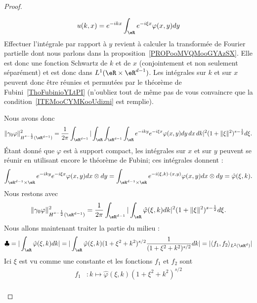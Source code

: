 \begin{proof}
\begin{subproof}
\begin{equation}
			u(k,x)= e^{-ikx}\int_{\eR} e^{-i\xi x}\varphi(x,y)dy
		\end{equation}
		Effectuer l'intégrale par rapport à \( y\) revient à calculer la transformée de Fourier partielle dont nous parlons dans la proposition~\ref{PROPooMVQMooGYAzSX}. Elle est donc une fonction Schwartz de \( k\) et de \( x\) (conjointement et non seulement séparément) et est donc dans \( L^1(\eR\times \eR^{d-1})\). Les intégrales sur \( k \) et sur \( x\) peuvent donc être réunies et permutées par le théorème de Fubini~\ref{ThoFubinioYLtPI} (n'oubliez tout de même pas de vous convaincre que la condition~\ref{ITEMooCYMKooUdizni} est remplie).

		Nous avons donc
		\begin{equation}
			\| \gamma_0\varphi \|^2_{H^{s-\frac{ 1 }{2}}(\eR^{d-1})}=\frac{1}{ 2\pi }\int_{\eR^{d-1}}|\int_{\eR}\int_{\eR^{d-1}}\int_{\eR} e^{-iky} e^{-i\xi x}\varphi(x,y)dy\,dx\,dk|^2(1+\| \xi \|^2)^{s-\frac{ 1 }{2}}d\xi.
		\end{equation}
		Étant donné que \( \varphi\) est à support compact, les intégrales sur \( x\) et sur \( y\) peuvent se réunir en utilisant encore le théorème de Fubini; ces intégrales donnent :
		\begin{equation}
			\int_{\eR^{d-1}\times \eR} e^{-iky} e^{-i\xi x}\varphi(x,y)dx\otimes dy=\int_{\eR^{d-1}\times \eR} e^{  -i(\xi,k)\cdot(x,y)  }\varphi(x,y)dx\otimes dy=\hat \varphi(\xi,k).
		\end{equation}
		Nous restons avec
		\begin{equation}
			\| \gamma_0\varphi \|^2_{H^{s-\frac{ 1 }{2}}(\eR^{d-1})}=\frac{1}{ 2\pi }\int_{\eR^{d-1}}|   \int_{\eR}\hat \varphi(\xi,k)dk    |^2(1+\| \xi \|^2)^{s-\frac{ 1 }{2}}d\xi.
		\end{equation}
		Nous allons maintenant traiter la partie du milieu :
		\begin{equation}
			\clubsuit=|\int_{\eR}\hat \varphi(\xi,k)dk|=| \int_{\eR}\hat \varphi(\xi,k)(1+\xi^2+k^2)^{s/2}\frac{1}{ (1+\xi^2+k^2)^{s/2} }dk |=| \langle f_1, f_2\rangle_{L^2(\eR^d)} |
		\end{equation}
		Ici \( \xi\) est vu comme une constante et les fonctions \( f_1\) et \( f_2\) sont
		\begin{subequations}
			\begin{align}
				f_1 & \colon k\mapsto \hat \varphi(\xi,k)(1+\xi^2+k^2)^{s/2} \\

\end{align}
\end{subequations}
\end{subproof}
\end{proof}
